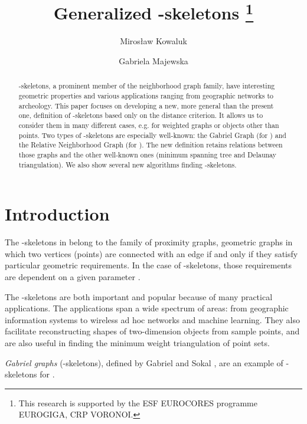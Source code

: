 \documentclass[11pt]{llncs}
\begin{document}
\title{Generalized -skeletons
\thanks{This research is supported by the ESF EUROCORES programme EUROGIGA,
CRP VORONOI.}}
\author{
        Miros{\l}aw Kowaluk  
\and
        Gabriela Majewska  
}


\maketitle

\begin{abstract}
-skeletons, a prominent member of the neighborhood graph family, have
interesting geometric properties and various applications ranging from
geographic networks to archeology.
This paper focuses on developing a new, more general than the present one, definition
of -skeletons based only on the distance criterion.
It allows us to consider them in many different cases, e.g. for weighted graphs 
or objects other than points.
Two types of -skeletons are especially well-known: the Gabriel Graph 
(for ) and the Relative Neighborhood Graph (for ).
The new definition retains relations between those graphs and the other well-known ones
(minimum spanning tree and Delaunay triangulation).
We also show several new algorithms finding -skeletons.           
\end{abstract} 


\section{Introduction}

The -skeletons \cite{kr85} in  belong to the family of
proximity graphs, geometric graphs in which two vertices (points) are connected
with an edge if and only if they satisfy particular geometric requirements.
In the case of -skeletons, those requirements are dependent on a given parameter 
. 
 
The -skeletons are both important and popular because of many practical 
applications. The applications span a wide spectrum of areas: 
from geographic information systems to wireless ad hoc networks and machine learning. 
They also facilitate reconstructing  shapes of two-dimension objects from 
sample points, and are also useful in finding the minimum weight triangulation 
of point sets. 
  
{\em Gabriel graphs} (-skeletons), 
defined by Gabriel and Sokal \cite{gs69}, are an example of -skeletons for .
\end{document}
